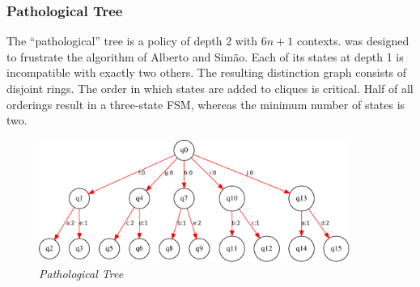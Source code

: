 \subsubsection{Pathological Tree}
The ``pathological'' tree is a policy of depth 2 with $6n+1$ contexts.
was designed to frustrate the algorithm of Alberto and Sim\~ao.
Each of its states at depth 1 is incompatible with exactly two others.  
The resulting distinction graph consists of disjoint rings. 
The order in which states are added to cliques is critical.  
Half of all orderings result in a three-state FSM, whereas the minimum number of states is two.
\begin{figure}
\centering
\includegraphics[width=4in]{big_patho_tree.pdf} 
\caption{\emph{Pathological Tree} }
\end{figure}
